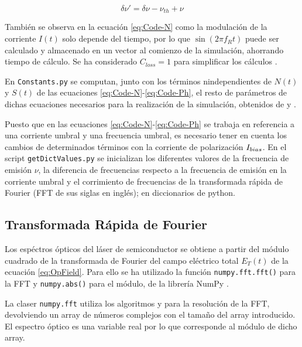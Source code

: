 			\begin{equation}
				\delta\nu' = \delta\nu - \nu_{th} + \nu
			\end{equation}

		Tambi\'en se observa en la ecuaci\'on \ref{eq:Code-N} como la modulaci\'on de la corriente $I(t)$ solo depende del tiempo, por lo que $\sin(2\pi f_R t)$ puede ser calculado y almacenado en un vector al comienzo de la simulaci\'on, ahorrando tiempo de c\'alculo. Se ha considerado $C_{loss} = 1$ para simplificar los c\'alculos \cite{Chaves19}.

		En \texttt{Constants.py} se computan, junto con los t\'erminos nindependientes de $N(t)$ y $S(t)$ de las ecuaciones \ref{eq:Code-N}-\ref{eq:Code-Ph}, el resto de par\'ametros de dichas ecuaciones necesarios para la realizaci\'on de la simulaci\'on, obtenidos de \cite{artSim} y \cite{Chaves19}.

		Puesto que en las ecuaciones \ref{eq:Code-N}-\ref{eq:Code-Ph} se trabaja en referencia a una corriente umbral y una frecuencia umbral, es necesario tener en cuenta los cambios de determinados t\'erminos con la corriente de polarización $I_{bias}$. En el script \texttt{getDictValues.py} se inicializan los diferentes valores de la frecuencia de emisión $\nu$, la diferencia de frecuencias respecto a la frecuencia de emisi\'on en la corriente umbral \cite{Chaves19} y el corrimiento de frecuencias de la transformada r\'apida de Fourier (FFT de sus siglas en ingl\'es); en diccionarios de python.

	\subsection{Transformada R\'apida de Fourier}
		\label{Mdl:Code:FFT}

		Los esp\'ectros \'opticos del l\'aser de semiconductor se obtiene a partir del m\'odulo cuadrado de la transformada de Fourier del campo el\'ectrico total $E_T(t)$ de la ecuaci\'on \ref{eq:OpField}. Para ello se ha utilizado la función \texttt{numpy.fft.fft()} para la FFT y \texttt{numpy.abs()} para el m\'odulo, de la librer\'ia NumPy \cite{numpy}.

		La claser \texttt{numpy.fft} utiliza los algoritmos \cite{numerical} y \cite{cooley1965algorithm} para la resoluci\'on de la FFT, devolviendo un array de n\'umeros complejos con el tamaño del array introducido. El espectro \'optico es una variable real por lo que corresponde al m\'odulo de dicho array. 

